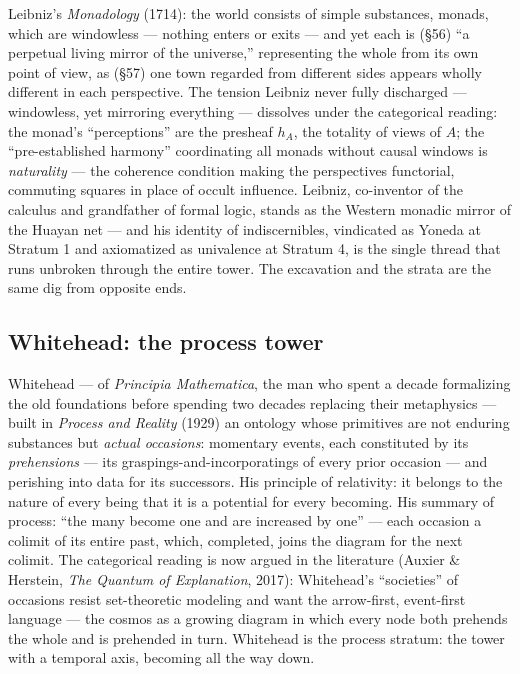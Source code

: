 \documentclass[11pt]{article}
\theoremstyle{plain}
\theoremstyle{definition}
\theoremstyle{remark}
\begin{document}
Leibniz's \emph{Monadology} (1714): the world consists of simple substances, monads, which are windowless --- nothing enters or exits --- and yet each is (\S 56) ``a perpetual living mirror of the universe,'' representing the whole from its own point of view, as (\S 57) one town regarded from different sides appears wholly different in each perspective. The tension Leibniz never fully discharged --- windowless, yet mirroring everything --- dissolves under the categorical reading: the monad's ``perceptions'' are the presheaf $h_A$, the totality of views of $A$; the ``pre-established harmony'' coordinating all monads without causal windows is \emph{naturality} --- the coherence condition making the perspectives functorial, commuting squares in place of occult influence. Leibniz, co-inventor of the calculus and grandfather of formal logic, stands as the Western monadic mirror of the Huayan net --- and his identity of indiscernibles, vindicated as Yoneda at Stratum 1 and axiomatized as univalence at Stratum 4, is the single thread that runs unbroken through the entire tower. The excavation and the strata are the same dig from opposite ends.

\subsection{Whitehead: the process tower}

Whitehead --- of \emph{Principia Mathematica}, the man who spent a decade formalizing the old foundations before spending two decades replacing their metaphysics --- built in \emph{Process and Reality} (1929) an ontology whose primitives are not enduring substances but \emph{actual occasions}: momentary events, each constituted by its \emph{prehensions} --- its graspings-and-incorporatings of every prior occasion --- and perishing into data for its successors. His principle of relativity: it belongs to the nature of every being that it is a potential for every becoming. His summary of process: ``the many become one and are increased by one'' --- each occasion a colimit of its entire past, which, completed, joins the diagram for the next colimit. The categorical reading is now argued in the literature (Auxier \& Herstein, \emph{The Quantum of Explanation}, 2017): Whitehead's ``societies'' of occasions resist set-theoretic modeling and want the arrow-first, event-first language --- the cosmos as a growing diagram in which every node both prehends the whole and is prehended in turn. Whitehead is the process stratum: the tower with a temporal axis, becoming all the way down.
\end{document}

